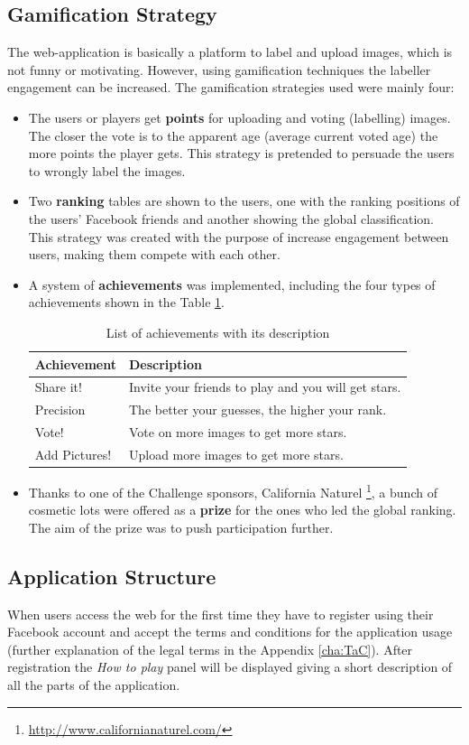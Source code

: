 \subsection{Gamification Strategy}
The web-application is basically a platform to label and upload images, which is not funny or motivating. However, using gamification techniques the labeller engagement can be increased. The gamification strategies used were mainly four:

\begin{itemize}
	\item The users or players get \textbf{points} for uploading and voting (labelling) images. The closer the vote is to the apparent age (average current voted age) the more points the player gets. This strategy is pretended to persuade the users to wrongly label the images.
	\item Two \textbf{ranking} tables are shown to the users, one with the ranking positions of the users' Facebook friends and another showing the global classification. This strategy was created with the purpose of increase engagement between users, making them compete with each other. 
	\item A system of \textbf{achievements} was implemented, including the four types of achievements shown in the Table \ref{tab:achiev}.
	\begin{table}[!h]
		\centering
		\begin{tabular}{l|l}
			\textbf{Achievement} & \textbf{Description} \\\hline\hline
			Share it! &	Invite your friends to play and you will get stars.	\\
			Precision &	The better your guesses, the higher your rank. \\
			Vote! &	Vote on more images to get more stars.\\	
			Add Pictures! &	Upload more images to get more stars. \\
		\end{tabular}
		\caption{List of achievements with its description}
		\label{tab:achiev}
	\end{table}
	\item Thanks to one of the Challenge sponsors, California Naturel \footnote{\url{http://www.californianaturel.com/}}, a bunch of cosmetic lots were offered as a \textbf{prize} for the ones who led the global ranking. The aim of the prize was to push participation further.
\end{itemize}


\subsection{Application Structure}
When users access the web for the first time they have to register using their Facebook account and accept the terms and conditions for the application usage (further explanation of the legal terms in the Appendix \ref{cha:TaC}). After registration the \textit{How to play} panel will be displayed giving a short description of all the parts of the application.

